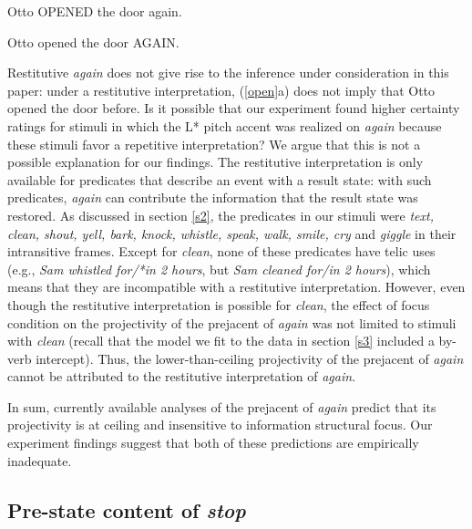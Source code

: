 \documentclass[a4paper,12pt]{article}
\newcommand{\6}{\mbox{$[\hspace*{-.6mm}[$}}
\newcommand{\9}{\mbox{$]\hspace*{-.6mm}]$}}
\begin{document}
\begin{exe}
\ex\label{open} \citealt[280]{beck2006}
\begin{xlist}

\ex Otto OPENED the door again.

\ex Otto opened the door AGAIN.

\end{xlist}
\end{exe}
Restitutive {\em again} does not give rise to the inference under consideration in this paper: under a restitutive interpretation, (\ref{open}a) does not imply that Otto opened the door before. Is it possible that our experiment found higher certainty ratings for stimuli in which the L* pitch accent was realized on {\em again} because these stimuli favor a repetitive interpretation? We argue that this is not a possible explanation for our findings. The restitutive interpretation is only available for predicates that describe an event with a result state: with such predicates, {\em again} can contribute the information that the result state was restored. As discussed in section \ref{s2}, the predicates in our stimuli were {\em text, clean, shout, yell, bark, knock, whistle, speak, walk, smile, cry} and {\em giggle} in their intransitive frames. Except for {\em clean}, none of these predicates have telic uses (e.g., {\em Sam whistled for/*in 2 hours}, but {\em Sam cleaned for/in 2 hours}), which means that they are incompatible with a restitutive interpretation. However, even though the restitutive interpretation is possible for {\em clean}, the effect of focus condition on the projectivity of the prejacent of {\em again} was not limited to stimuli with {\em clean} (recall that the model we fit to the data in section \ref{s3} included a by-verb intercept). Thus, the lower-than-ceiling projectivity of the prejacent of {\em again} cannot be attributed to the restitutive interpretation of {\em again}.

In sum, currently available analyses of the prejacent of {\em again} predict that its projectivity is at ceiling and insensitive to information structural focus. Our experiment findings suggest that both of these predictions are empirically inadequate.

\subsection{Pre-state content of {\em stop}}\label{s43}
\end{document}
